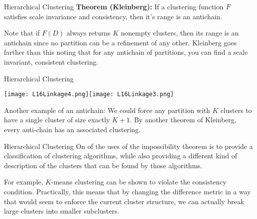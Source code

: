 \documentclass[10pt, table, dvipsnames,xcdraw,handout]{beamer}
\begin{document}
\begin{frame}[fragile]{Hierarchical Clustering}
\textbf{Theorem (Kleinberg):} If a clustering function $F$ satisfies scale invariance and consistency, then it's range is an antichain. 

Note that if $F(D)$ always returns $K$ nonempty clusters, then its range is an antichain since no partition can be a refinement of any other. Kleinberg goes farther than this noting that for any antichain of partitions, you can find a scale invariant, consistent clustering.
\end{frame}





\begin{frame}[fragile]{Hierarchical Clustering}
  \begin{minipage}[t][0.5\textheight][t]{\textwidth}
	\centering \texttt{[image: L16Linkage4.png]}\texttt{[image: L16Linkage3.png]}
  \end{minipage}
  \vfill
\begin{minipage}[t][0.5\textheight][t]{\textwidth}
Another example of an antichain: We could force any partition with $K$ clusters to have a single cluster of size exactly $K+1$. By another theorem of Kleinberg, every anti-chain has an associated clustering. 
\end{minipage}
\end{frame}


\begin{frame}[fragile]{Hierarchical Clustering}
On of the uses of the impossibility theorem is to provide a classification of clustering algorithms, while also providing a different kind of description of the clusters that can be found by those algorithms. 

For example, $K$-means clustering can be shown to violate the consistency condition. Practically, this means that by changing the difference metric in a way that would seem to enforce the current cluster structure, we can actually break large clusters into smaller subclusters. 
\end{frame}
\end{document}
